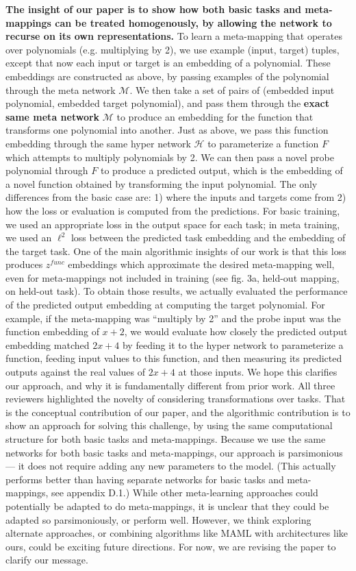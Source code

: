 \documentclass{article}
\begin{document}
\textbf{The insight of our paper is to show how both basic tasks and meta-mappings can be treated homogenously, by allowing the network to recurse on its own representations.} To learn a meta-mapping that operates over polynomials (e.g. multiplying by 2), we use example (input, target) tuples, except that now each input or target is an embedding of a polynomial. These embeddings are constructed as above, by passing examples of the polynomial through the meta network $\mathcal{M}$. We then take a set of pairs of (embedded input polynomial, embedded target polynomial), and pass them through the \textbf{exact same meta network} $\mathcal{M}$ to produce an embedding for the function that transforms one polynomial into another. Just as above, we pass this function embedding through the same hyper network $\mathcal{H}$ to parameterize a function $F$ which attempts to multiply polynomials by 2. We can then pass a novel probe polynomial through $F$ to produce a predicted output, which is the embedding of a novel function obtained by transforming the input polynomial. The only differences from the basic case are: 1) where the inputs and targets come from 2) how the loss or evaluation is computed from the predictions. For basic training, we used an appropriate loss in the output space for each task; in meta training, we used an $\ell^2$ loss between the predicted task embedding and the embedding of the target task. One of the main algorithmic insights of our work is that this loss produces $z^{func}$ embeddings which approximate the desired meta-mapping well, even for meta-mappings not included in training (see fig. 3a, held-out mapping, on held-out task). To obtain those results, we actually evaluated the performance of the predicted output embedding at computing the target polynomial. For example, if the meta-mapping was ``multiply by 2'' and the probe input was the function embedding of $x + 2$, we would evaluate how closely the predicted output embedding matched $2x + 4$ by feeding it to the hyper network to parameterize a function, feeding input values to this function, and then measuring its predicted outputs against the real values of $2x+4$ at those inputs. We hope this clarifies our approach, and why it is fundamentally different from prior work. All three reviewers highlighted the novelty of considering transformations over tasks. That is the conceptual contribution of our paper, and the algorithmic contribution is to show an approach for solving this challenge, by using the same computational structure for both basic tasks and meta-mappings. Because we use the same networks for both basic tasks and meta-mappings, our approach is parsimonious --- it does not require adding any new parameters to the model. (This actually performs better than having separate networks for basic tasks and meta-mappings, see appendix D.1.) While other meta-learning approaches could potentially be adapted to do meta-mappings, it is unclear that they could be adapted so parsimoniously, or perform well. However, we think exploring alternate approaches, or combining algorithms like MAML with architectures like ours, could be exciting future directions. For now, we are revising the paper to clarify our message. \par 
\end{document}
